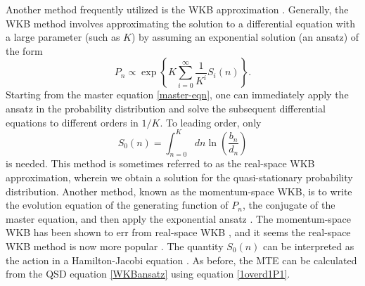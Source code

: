 Another method frequently utilized is the WKB approximation \cite{Doering2005,Assaf2006,Kessler2007,Kamenev2008,Assaf2010,Ovaskainen2010,Gottesman2012,Assaf2016,Yu2017}. 
Generally, the WKB method involves approximating the solution to a differential equation with a large parameter (such as $K$) by assuming an exponential solution (an ansatz) of the form \cite{Assaf2016}
\begin{equation}
P_n \propto \exp \left\{ K \sum_{i=0}^\infty \frac{1}{K^i}S_i(n) \right\}.
 \label{WKBansatz}
\end{equation}
Starting from the master equation \ref{master-eqn}, one can immediately apply the ansatz in the probability distribution and solve the subsequent differential equations to different orders in $1/K$\cite{Assaf2016}. %
To leading order, only 
\begin{equation}
S_0(n) = \int_{n=0}^{K} dn \ln\left(\frac{b_n}{d_n}\right)
 \label{WKBaction}
\end{equation}
is needed. 
This method is sometimes referred to as the real-space WKB approximation, wherein we obtain a solution for the quasi-stationary probability distribution.
Another method, known as the momentum-space WKB, is to write the evolution equation of the generating function of $P_n$, the conjugate of the master equation, and then apply the exponential ansatz \cite{Assaf2006,Assaf2016}. 
The momentum-space WKB has been shown to err from real-space WKB \cite{Ovaskainen2010,Assaf2016}, and it seems the real-space WKB method is now more popular \cite{Kessler2007,Kamenev2008,Assaf2010,Ovaskainen2010,Gottesman2012,Assaf2016,Yu2017}. 
The quantity $S_0(n)$ can be interpreted as the action in a Hamilton-Jacobi equation \cite{Assaf2016}. 
As before, the MTE can be calculated from the QSD equation \ref{WKBansatz} using equation \ref{1overd1P1}. 

